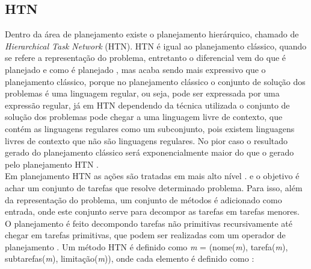 

\subsection{HTN} 


Dentro da área de planejamento existe o planejamento hierárquico, chamado de \textit{Hierarchical Task Network} (HTN). HTN é igual ao planejamento clássico, quando se refere a representação do problema, entretanto o diferencial vem do que é planejado e como é planejado \cite{ghallab2004automated}, mas acaba sendo mais expressivo que o planejamento clássico, porque no planejamento clássico o conjunto de solução dos problemas é uma linguagem regular, ou seja, pode ser expressada por uma expressão regular, já em HTN dependendo da técnica utilizada o conjunto de solução dos problemas pode chegar a uma linguagem livre de contexto, que contém as linguagens regulares como um subconjunto, pois existem linguagens livres de contexto que não são linguagens regulares. No pior caso o resultado gerado do planejamento clássico será exponencialmente maior do que o gerado pelo planejamento HTN \cite{ghallab2004automated}.  \\

Em planejamento HTN as ações são tratadas em mais alto nível \cite{intelligence2003modern}. e o objetivo é achar um conjunto de tarefas que resolve determinado problema. Para isso, além da representação do problema, um conjunto de métodos é adicionado como entrada, onde este conjunto serve para decompor as tarefas em tarefas menores. O planejamento é feito decompondo tarefas não primitivas recursivamente até chegar em tarefas primitivas, que podem ser realizadas com um operador de planejamento \cite{ghallab2004automated}. Um método HTN é definido como \textit{m} = (nome(\textit{m}), tarefa(\textit{m}), subtarefas(\textit{m}), limitação(\textit{m})), onde cada elemento é definido como \cite{ghallab2004automated}: 
 
